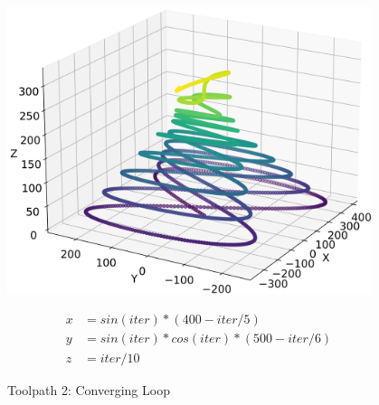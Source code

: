 \begin{figure}[H]%
	\centering
	\begin{minipage}{0.5\textwidth}
			\includegraphics[width=0.95\textwidth]{figures/path2.png}
		\caption{Toolpath 2: Converging Loop}
		\label{path2}
	\end{minipage}\hfill
	\begin{minipage}{0.5\textwidth}
		\begin{equation}\label{eq2}
			\begin{split}
				x &= sin(iter) * (400-iter / 5)\\
				y &= sin(iter) * cos(iter) * (500-iter / 6)\\
				z &= iter / 10
			\end{split}
		\end{equation}
	\end{minipage}\par
\end{figure}


